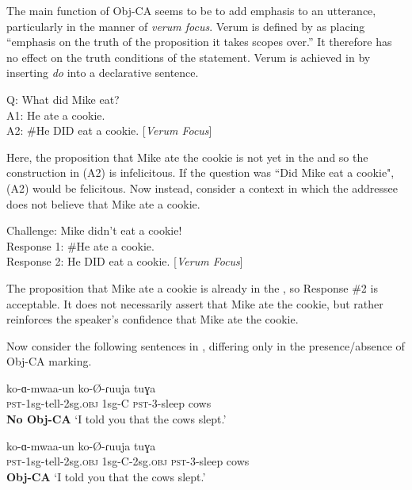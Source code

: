 \documentclass[output=paper
,newtxmath
,modfonts
,nonflat]{langsci/langscibook}
\begin{document}
The main function of Obj-CA seems to be to add emphasis to an utterance, particularly in the manner of \textit{verum focus}. Verum  is defined by \citet{Hohle:1992} as placing ``emphasis on the truth of the proposition it takes scopes over.'' It therefore has no effect on the truth conditions of the statement. Verum  is achieved in  by inserting \textit{do} into a declarative sentence. 

\ea \label{No-VF English}
Q: What did Mike eat? \\
A1: He ate a cookie. \\
A2: \#He DID eat a cookie. \hfill [\textit{Verum Focus}]
\z

\noindent Here, the proposition that Mike ate the cookie is not yet in the  and so the  construction in (A2) is infelicitous. If the question was ``Did Mike eat a cookie", (A2) would be felicitous. Now instead, consider a context in which the addressee does not believe that Mike ate a cookie.

\ea \label{VF English}
Challenge: Mike didn't eat a cookie! \\
Response 1: \#He ate a cookie. \\
Response 2: He DID eat a cookie. \hfill [\textit{Verum Focus}]
\z

\noindent The proposition that Mike ate a cookie is already in the , so Response \#2 is acceptable. It does not necessarily assert that Mike ate the cookie, but rather reinforces the speaker's confidence that Mike ate the cookie.  

Now consider the following sentences in , differing only in the presence/absence of Obj-CA marking.

\ea \label{Obj-CA Contexts} 
\begin{xlist}

\ex \label{Obj-CA 1}
\gll ko-ɑ-mwaa-un  ko-\O-ɾuuja tuɣa \\
\textsc{pst}-1sg-tell-2sg.\textsc{obj} 1sg-C \textsc{pst}-3-sleep cows \\
\hfill \textbf{No Obj-CA}
\glt `I told you that the cows slept.'
	
\ex \label{Obj-CA 2}
\gll ko-ɑ-mwaa-un  ko-\O-ɾuuja tuɣa \\
\textsc{pst}-1sg-tell-2sg.\textsc{obj} 1sg-C-2sg.\textsc{obj} \textsc{pst}-3-sleep cows \\
\hfill \textbf{Obj-CA}
\glt `I told you that the cows slept.'

\end{xlist}
\z
\end{document}
